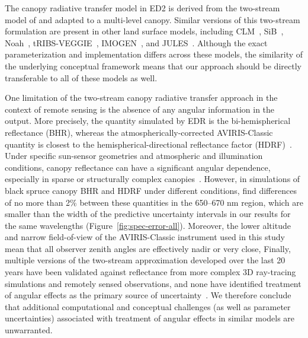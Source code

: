 The canopy radiative transfer model in ED2 is derived from the two-stream model of \citet{sellers1985canopy} and adapted to a multi-level canopy.
Similar versions of this two-stream formulation are present in other land surface models, including CLM~\citep{clm45_note}, SiB~\citep{baker2008seasonal}, Noah~\citep{niu2011community}, tRIBS-VEGGIE~\citep{ivanov2008vegetationhydrology}, IMOGEN~\citep{huntingford2008quantifying}, and JULES~\citep{best_2011_joint}.
Although the exact parameterization and implementation differs across these models, the similarity of the underlying conceptual framework means that our approach should be directly transferable to all of these models as well.

One limitation of the two-stream canopy radiative transfer approach in the context of remote sensing is the absence of any angular information in the output.
More precisely, the quantity simulated by EDR is the bi-hemispherical reflectance (BHR), whereas the atmospherically-corrected AVIRIS-Classic quantity is closest to the hemispherical-directional reflectance factor (HDRF)~\citep[\emph{sensu}]{schaepman-strub2006reflectance}.
Under specific sun-sensor geometries and atmospheric and illumination conditions, canopy reflectance can have a significant angular dependence, especially in sparse or structurally complex canopies~\citep[e.g., ``hot spot effect'';][]{maignan2004bidirectional,schaepman-strub2006reflectance}.
However, in simulations of black spruce canopy BHR and HDRF under different conditions, \citet{schaepman-strub2006reflectance} find differences of no more than 2\% between these quantities in the 650--670 \unit{nm} region, which are smaller than the width of the predictive uncertainty intervals in our results for the same wavelengths (Figure~\ref{fig:spec-error-all}).
Moreover, the lower altitude and narrow field-of-view of the AVIRIS-Classic instrument used in this study mean that all observer zenith angles are effectively nadir or very close,
Finally, multiple versions of the two-stream approximation developed over the last 20 years have been validated against reflectance from more complex 3D ray-tracing simulations and remotely sensed observations, and none have identified treatment of angular effects as the primary source of uncertainty~\citep{hogan_2018_fast, yuan2017reexamination, pinty2004synergy}.
We therefore conclude that additional computational and conceptual challenges (as well as parameter uncertainties) associated with treatment of angular effects in similar models are unwarranted.

